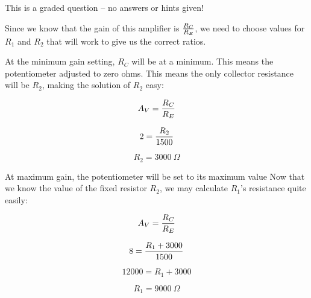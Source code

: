 \vfil 

\eject






This is a graded question -- no answers or hints given!







Since we know that the gain of this amplifier is $R_C \over R_E$, we need to choose values for $R_1$ and $R_2$ that will work to give us the correct ratios.

\vskip 10pt

At the minimum gain setting, $R_C$ will be at a minimum.  This means the potentiometer adjusted to zero ohms.  This means the only collector resistance will be $R_2$, making the solution of $R_2$ easy:

$$A_V = {R_C \over R_E}$$

$$2 = {R_2 \over 1500}$$

$$R_2 = 3000 \> \Omega$$

\vskip 10pt

At maximum gain, the potentiometer will be set to its maximum value  Now that we know the value of the fixed resistor $R_2$, we may calculate $R_1$'s resistance quite easily:

$$A_V = {R_C \over R_E}$$

$$8 = {R_1 + 3000 \over 1500}$$

$$12000 = R_1 + 3000$$

$$R_1 = 9000 \> \Omega$$





